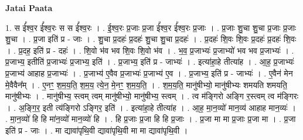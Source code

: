 \documentclass[17pt]{extarticle}
\begin{document}
\textbf{Jatai Paata} \newline

1. स ई᳚श्व॒र ई᳚श्व॒रः स स ई᳚श्व॒रः । . ई॒श्व॒रः प्र॒जाः प्र॒जा ई᳚श्व॒र ई᳚श्व॒रः प्र॒जाः । . प्र॒जाः शु॒चा शु॒चा प्र॒जाः प्र॒जाः शु॒चा । . प्र॒जा इति॑ प्र - जाः । . शु॒चा प्र॒दहः॑ प्र॒दहः॑ शु॒चा शु॒चा प्र॒दहः॑ । . प्र॒दहः॑ शि॒वः शि॒वः प्र॒दहः॑ प्र॒दहः॑ शि॒वः । . प्र॒दह॒ इति॑ प्र - दहः॑ । . शि॒वो भ॑व भव शि॒वः शि॒वो भ॑व । . भ॒व॒ प्र॒जाभ्यः॑ प्र॒जाभ्यो॑ भव भव प्र॒जाभ्यः॑ । . प्र॒जाभ्य॒ इतीति॑ प्र॒जाभ्यः॑ प्र॒जाभ्य॒ इति॑ । . प्र॒जाभ्य॒ इति॑ प्र - जाभ्यः॑ । . इत्या॑हा॒हे तीत्या॑ह । . आ॒ह॒ प्र॒जाभ्यः॑ प्र॒जाभ्य॑ आहाह प्र॒जाभ्यः॑ । . प्र॒जाभ्य॑ ए॒वैव प्र॒जाभ्यः॑ प्र॒जाभ्य॑ ए॒व । . प्र॒जाभ्य॒ इति॑ प्र - जाभ्यः॑ । . ए॒वैन॑ मेन मे॒वैवैन᳚म् । . ए॒नꣳ॒॒ श॒म॒य॒ति॒ श॒म॒य॒ त्ये॒न॒ मे॒नꣳ॒॒ श॒म॒य॒ति॒ । . श॒म॒य॒ति॒ मानु॑षीभ्यो॒ मानु॑षीभ्यः शमयति शमयति॒ मानु॑षीभ्यः । . मानु॑षीभ्य॒ स्त्वम् त्वम् मानु॑षीभ्यो॒ मानु॑षीभ्य॒ स्त्वम् । . त्व म॑ङ्गिरो अङ्गि र॒स्त्वम् त्व म॑ङ्गिरः । . अ॒ङ्गि॒र॒ इती त्य॑ङ्गिरो ऽङ्गिर॒ इति॑ । . इत्या॑हा॒हे तीत्या॑ह । . आ॒ह॒ मा॒न॒व्यो॑ मान॒व्य॑ आहाह मान॒व्यः॑ । . मा॒न॒व्यो॑ हि हि मा॑न॒व्यो॑ मान॒व्यो॑ हि । . हि प्र॒जाः प्र॒जा हि हि प्र॒जाः । . प्र॒जा मा मा प्र॒जाः प्र॒जा मा । . प्र॒जा इति॑ प्र - जाः । . मा द्यावा॑पृथि॒वी द्यावा॑पृथि॒वी मा मा द्यावा॑पृथि॒वी । \newline
\end{document}
